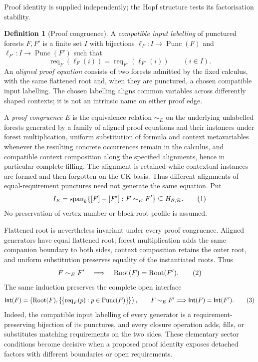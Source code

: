 \documentclass[10pt,a4paper]{article}
\theoremstyle{plain}
\theoremstyle{definition}
\newtheorem{definition}[theorem]{Definition}
\theoremstyle{remark}
\newcommand{\Base}{\mathcal B}
\newcommand{\Rules}{\mathcal R}
\newcommand{\Hlic}{H_{\Base,\Rules}}
\newcommand{\Root}{\operatorname{Root}}
\newcommand{\Req}{\operatorname{req}}
\newcommand{\Punc}{\operatorname{Punc}}
\newcommand{\eqtag}{\refstepcounter{equation}\tag{\theequation}}
\begin{document}
Proof identity is supplied independently; the Hopf structure tests its
factorisation stability.

\begin{definition}[Proof congruence]
\label{def:proof-congruence}
A \emph{compatible input labelling} of punctured forests \(F,F'\) is a
finite set \(I\) with bijections
\(\ell_F:I\to\Punc(F)\) and
\(\ell_{F'}:I\to\Punc(F')\) such that
\[
 \Req_F(\ell_F(i))=\Req_{F'}(\ell_{F'}(i))
 \qquad(i\in I).
\]
An \emph{aligned proof equation} consists of two forests admitted by the
fixed calculus, with the
same flattened root and, when they are punctured, a chosen compatible
input labelling.  The chosen labelling aligns common variables across
differently shaped contexts; it is not an intrinsic name on either proof
edge.

A \emph{proof congruence} \(E\) is the equivalence relation
\(\sim_E\) on the underlying unlabelled forests generated by a family of
aligned proof equations and their instances under forest multiplication,
uniform substitution of formula and context metavariables whenever the
resulting concrete occurrences remain in the calculus, and compatible context
composition along the specified alignments, hence in particular complete
filling.  The
alignment is retained while contextual instances are formed and then
forgotten on the CK basis.  Thus different alignments of equal-requirement
punctures need not generate the same equation.  Put
\[
 I_E=\operatorname{span}_k
       \{[F]-[F']:F\sim_EF'\}\subseteq\Hlic .
\eqtag\label{eq:proof-congruence-ideal}
\]
No preservation of vertex number or block-root profile is assumed.
\end{definition}

Flattened root is nevertheless invariant under every proof congruence.
Aligned generators have equal flattened root; forest multiplication adds the
same companion boundary to both sides, context composition retains the outer
root, and uniform substitution preserves equality of the instantiated roots.
Thus
\[
                 F\sim_EF'\quad\Longrightarrow\quad
                 \Root(F)=\Root(F').
\eqtag\label{eq:proof-congruence-root-sector}
\]
The same induction preserves the complete open interface
\[
 \mathsf{Int}(F)=
 \left(
   \Root(F),
   \bigl\{\!\bigl\{\Req_F(p):p\in\Punc(F)\bigr\}\!\bigr\}
 \right),
 \qquad
 F\sim_EF'\Longrightarrow\mathsf{Int}(F)=\mathsf{Int}(F').
\eqtag\label{eq:proof-congruence-interface-sector}
\]
Indeed, the compatible input labelling of every generator is a
requirement-preserving bijection of its punctures, and every closure operation
adds, fills, or substitutes matching requirements on the two sides.  These
elementary sector conditions become decisive when a proposed proof identity
exposes detached factors with different boundaries or open requirements.
\end{document}
